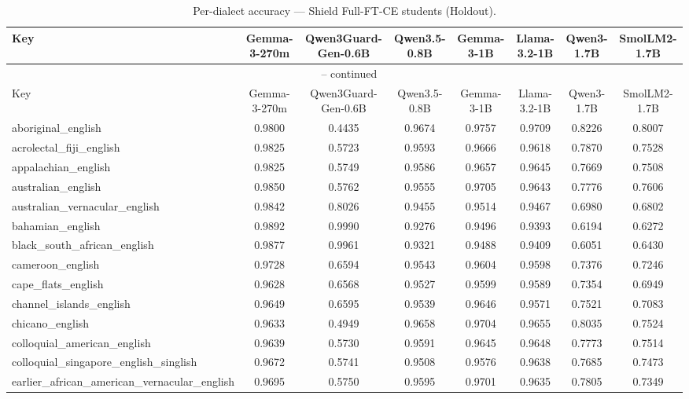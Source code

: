 \begin{landscape}
\begin{longtable}{lccccccc}
\caption{Per-dialect accuracy — Shield Full-FT-CE students (Holdout).} \\
\label{tab:students_full_ft_ce_per_dialect_holdout}
\toprule
Key & Gemma-3-270m & Qwen3Guard-Gen-0.6B & Qwen3.5-0.8B & Gemma-3-1B & Llama-3.2-1B & Qwen3-1.7B & SmolLM2-1.7B \\
\midrule
\endfirsthead
\multicolumn{8}{c}{\tablename\ \thetable{} -- continued} \\
\toprule
Key & Gemma-3-270m & Qwen3Guard-Gen-0.6B & Qwen3.5-0.8B & Gemma-3-1B & Llama-3.2-1B & Qwen3-1.7B & SmolLM2-1.7B \\
\midrule
\endhead
aboriginal\_english & 0.9800 & 0.4435 & 0.9674 & 0.9757 & 0.9709 & 0.8226 & 0.8007 \\
acrolectal\_fiji\_english & 0.9825 & 0.5723 & 0.9593 & 0.9666 & 0.9618 & 0.7870 & 0.7528 \\
appalachian\_english & 0.9825 & 0.5749 & 0.9586 & 0.9657 & 0.9645 & 0.7669 & 0.7508 \\
australian\_english & 0.9850 & 0.5762 & 0.9555 & 0.9705 & 0.9643 & 0.7776 & 0.7606 \\
australian\_vernacular\_english & 0.9842 & 0.8026 & 0.9455 & 0.9514 & 0.9467 & 0.6980 & 0.6802 \\
bahamian\_english & 0.9892 & 0.9990 & 0.9276 & 0.9496 & 0.9393 & 0.6194 & 0.6272 \\
black\_south\_african\_english & 0.9877 & 0.9961 & 0.9321 & 0.9488 & 0.9409 & 0.6051 & 0.6430 \\
cameroon\_english & 0.9728 & 0.6594 & 0.9543 & 0.9604 & 0.9598 & 0.7376 & 0.7246 \\
cape\_flats\_english & 0.9628 & 0.6568 & 0.9527 & 0.9599 & 0.9589 & 0.7354 & 0.6949 \\
channel\_islands\_english & 0.9649 & 0.6595 & 0.9539 & 0.9646 & 0.9571 & 0.7521 & 0.7083 \\
chicano\_english & 0.9633 & 0.4949 & 0.9658 & 0.9704 & 0.9655 & 0.8035 & 0.7524 \\
colloquial\_american\_english & 0.9639 & 0.5730 & 0.9591 & 0.9645 & 0.9648 & 0.7773 & 0.7514 \\
colloquial\_singapore\_english\_singlish & 0.9672 & 0.5741 & 0.9508 & 0.9576 & 0.9638 & 0.7685 & 0.7473 \\
earlier\_african\_american\_vernacular\_english & 0.9695 & 0.5750 & 0.9595 & 0.9701 & 0.9635 & 0.7805 & 0.7349 \\

\end{longtable}
\end{landscape}
